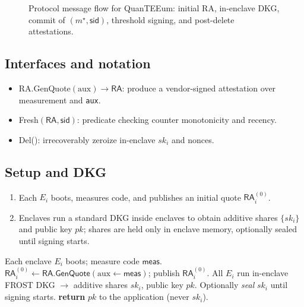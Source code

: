 \documentclass[runningheads,orivec]{llncs}
\newcommand{\prot}{\textsf{QuanTEEum}}
\newcommand{\sid}{\mathsf{sid}}
\newcommand{\RA}{\mathsf{RA}}
\newcommand{\FROST}{\textsf{FROST}}
\newcommand{\code}[1]{\texttt{#1}}
\begin{document}
\begin{figure}[!htbp]
\caption{Protocol message flow for \prot{}: initial RA, in-enclave DKG, commit of $(m^{\star},\mathsf{sid})$, threshold signing, and post-delete attestations.}
\label{fig:flow}
\end{figure}

\subsection*{Interfaces and notation}
\begin{itemize}[leftmargin=*,itemsep=0.25em]
  \item \textsf{RA.GenQuote}$(\text{aux}) \to \RA$: produce a vendor-signed attestation over measurement and \code{aux}.
  \item \textsf{Fresh}$(\RA,\sid)$: predicate checking counter monotonicity and recency.
  \item \textsf{Del}(): irrecoverably zeroize in-enclave $sk_i$ and nonces.
\end{itemize}

\subsection{Setup and DKG}
\begin{enumerate}[leftmargin=*,itemsep=0.25em]
  \item Each $E_i$ boots, measures code, and publishes an initial quote $\RA_i^{(0)}$.
  \item Enclaves run a standard DKG inside enclaves to obtain additive shares $\{sk_i\}$ and public key $pk$; shares are held only in enclave memory, optionally sealed until signing starts.
\end{enumerate}

\begin{algorithm}[!htbp]
\caption{\prot{}: \emph{SetupAndDKG} (inside enclaves)}
\label{alg:setup}
\begin{small}
\begin{algorithmic}[1]
\State Each enclave $E_i$ boots; measure code $\mathsf{meas}$.
\State $\RA_i^{(0)} \gets \textsf{RA.GenQuote}(\text{aux} \gets \mathsf{meas})$; publish $\RA_i^{(0)}$.
\State All $E_i$ run in\mbox{-}enclave \FROST{} DKG $\to$ additive shares $sk_i$, public key $pk$.
\State Optionally \emph{seal} $sk_i$ until signing starts.
\State \textbf{return} $pk$ to the application (never $sk_i$).
\end{algorithmic}
\end{small}
\end{algorithm}
\end{document}
